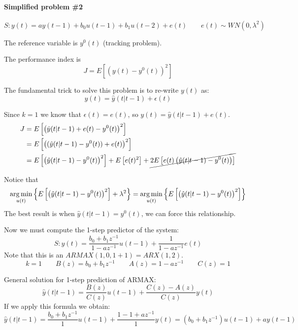 \paragraph{Simplified problem \#2}
\[
    S: y(t) = ay(t-1) + b_0u(t-1) + b_1u(t-2) + e(t) \qquad e(t) \sim WN(0, \lambda^2)
\]

The reference variable is $y^0(t)$ (tracking problem).

The performance index is
\[
    J = E\left[ (y(t) - y^0(t))^2 \right]
\]

The fundamental trick to solve this problem is to re-write $y(t)$ as:
\[
    y(t) = \hat{y}(t|t-1) + \epsilon(t)
\]

Since $k=1$ we know that $\epsilon(t) = e(t)$, so $y(t) = \hat{y}(t|t-1)+e(t)$.
\begin{align*}
    J &= E\left[ \left(\hat{y}(t|t-1)+e(t) - y^0(t)\right)^2 \right] \\
    &= E\left[   \left((\hat{y}(t|t-1)-y^0(t)) +e(t)\right)^2 \right] \\
    &= E\left[ \left(\hat{y}(t|t-1)-y^0(t)\right)^2 \right] + E\left[e(t)^2\right] + \cancel{2E\left[e(t)\left( \hat{y}(t|t-1)-y^0(t) \right)\right]} \\
\end{align*}

Notice that
\[
    \operatorname*{arg\,min}_{u(t)} \left\{ E\left[ \left(\hat{y}(t|t-1)-y^0(t)\right)^2 \right] + \lambda^2 \right\} = \operatorname*{arg\,min}_{u(t)} \left\{ E\left[ \left(\hat{y}(t|t-1)-y^0(t)\right)^2 \right] \right\}
\]
The best result is when $\hat{y}(t|t-1)=y^0(t)$, we can force this relationship.

Now we must compute the 1-step predictor of the system:
\[
    S: y(t) = \frac{b_0+b_1z^{-1}}{1-az^{-1}}u(t-1) + \frac{1}{1-az^{-1}}e(t)
\]
Note that this is an $ARMAX(1,0,1+1)=ARX(1,2)$.
\[
    k=1 \qquad B(z) = b_0+b_1z^{-1} \qquad A(z)=1-az^{-1} \qquad C(z) = 1
\]

General solution for 1-step prediction of ARMAX:
\[
    \hat{y}(t|t-1) = \frac{B(z)}{C(z)}u(t-1) + \frac{C(z)-A(z)}{C(z)}y(t)
\]
If we apply this formula we obtain:
\[
    \hat{y}(t|t-1) = \frac{b_0+b_1z^{-1}}{1}u(t-1) + \frac{1-1+az^{-1}}{1}y(t) = (b_0+b_1z^{-1})u(t-1)+ay(t-1)
\]

